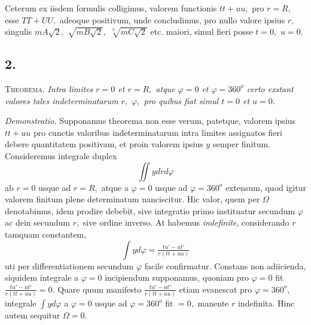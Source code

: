 \documentclass[14pt]{memoir}
\theoremstyle{plain}
\theoremstyle{remark}
\begin{document}
Ceterum ex iisdem formulis colligimus, valorem functionis \(tt+uu,\) pro \(r=R,\) esse \(TT+UU,\) adeoque positivum, unde concludimus, pro nullo valore ipsius \(r,\) singulis \(mA\surd{2},\) \(\sqrt{mB\surd{2}},\) \(\sqrt[3]{mC\surd{2}}\) etc. maiori, simul fieri posse \(t=0,\) \(u=0.\) 

\subsection*{2.} 

\textsc{Theorema.} \textit{Intra limites \(r=0\) et \(r=R,\) atque \(\varphi =0\) et \(\varphi = 360^o\) certo exstant valores tales indeterminatarum \(r,\) \(\varphi,\) pro quibus fiat simul \(t=0\) et \(u=0.\) }

\textit{Demonstratio.} Supponamus theorema non esse verum, patetque, valorem ipsius \(tt+uu\) pro cunctis valoribus indeterminatarum intra limites assignatos fieri debere quantitatem positivam, et proin valorem ipsius \(y\) semper finitum. Consideremus integrale duplex \[\iint y dr d\varphi \] ab \(r=0\) usque ad \(r=R,\) atque a \(\varphi =0\) usque ad \(\varphi = 360^o\) extensum, quod igitur valorem finitum plene determinatum nanciscitur. Hic valor, quem per \(\Omega\) denotabimus, idem prodire debebit, sive integratio primo instituatur secundum \(\varphi\) ac dein secundum \(r,\) sive ordine inverso. At habemus \textit{indefinite}, considerando \(r\) tamquam constantem, 
\[\displaystyle \int y d\varphi = \tfrac{tu'-ut'}{r(tt+uu)}\]
uti per differentiationem secundum \(\varphi\) facile confirmatur. Constans non adiicienda, siquidem integrale a \(\varphi=0\) incipiendum supponamus, quoniam pro \(\varphi=0\) fit \(\tfrac{tu'-ut'}{r(tt+uu)}=0\). Quare quum manifesto \(\tfrac{tu'-ut'}{r(tt+uu)}\) etiam evanescat pro \(\varphi=360^o,\) integrale \(\displaystyle \int yd\varphi\) a \(\varphi=0\) usque ad \(\varphi = 360^o\) fit \(=0,\) manente \(r\) 
indefinita. Hinc autem sequitur \(\Omega=0.\) 
\end{document}
